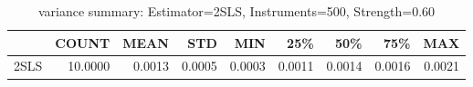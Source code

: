 \begin{table}[ht]
\centering
\caption{variance summary: Estimator=2SLS, Instruments=500, Strength=0.60}
\begin{tabular}{lrrrrrrrr}
\toprule
 & COUNT & MEAN & STD & MIN & 25\% & 50\% & 75\% & MAX \\
\midrule
2SLS & 10.0000 & 0.0013 & 0.0005 & 0.0003 & 0.0011 & 0.0014 & 0.0016 & 0.0021 \\
\bottomrule
\end{tabular}
\end{table}
